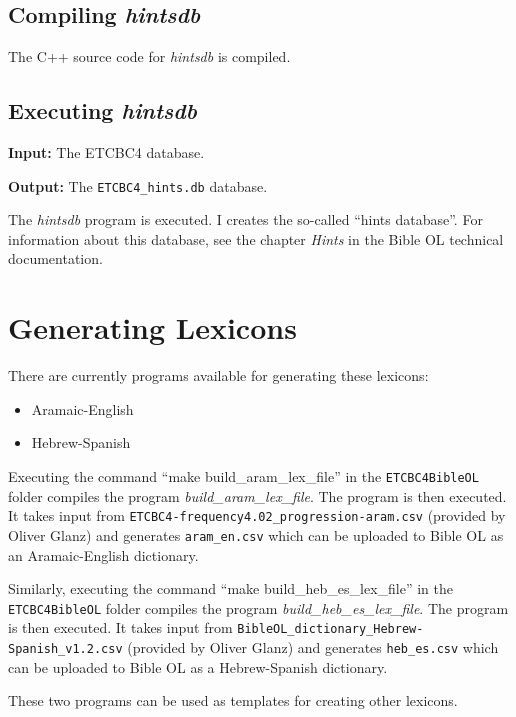 \documentclass[11pt,oneside,a4paper,article]{memoir}
\begin{document}
\section{Compiling \emph{hintsdb}}

The C++ source code for \emph{hintsdb} is compiled.


\section{Executing \emph{hintsdb}}

\noindent \textbf{Input:} The ETCBC4 database.

\noindent \textbf{Output:} The \texttt{ETCBC4\_hints.db} database.

\vspace{1ex}

The \emph{hintsdb} program is executed. I creates the so-called ``hints database''. For information
about this database, see the chapter \emph{Hints} in the Bible OL technical
documentation.


\chapter{Generating Lexicons}

There are currently programs available for generating these lexicons:
\begin{itemize}
\item Aramaic-English
\item Hebrew-Spanish
\end{itemize}

Executing the command ``make build\_aram\_lex\_file'' in the \texttt{ETCBC4BibleOL} folder compiles the
program \emph{build\_aram\_lex\_file}. The program is then executed. It takes input from
\texttt{ETCBC4-frequency4.02\_progression-aram.csv} (provided by Oliver Glanz) and generates
\texttt{aram\_en.csv} which can be uploaded to Bible OL as an Aramaic-English dictionary.

Similarly, executing the command ``make build\_heb\_es\_lex\_file'' in the \texttt{ETCBC4BibleOL} folder compiles the
program \emph{build\_heb\_es\_lex\_file}. The program is then executed. It takes input from
\texttt{BibleOL\_dictionary\_Hebrew-Spanish\_v1.2.csv} (provided by Oliver Glanz) and generates
\texttt{heb\_es.csv} which can be uploaded to Bible OL as a Hebrew-Spanish dictionary.

These two programs can be used as templates for creating other lexicons.
\end{document}
